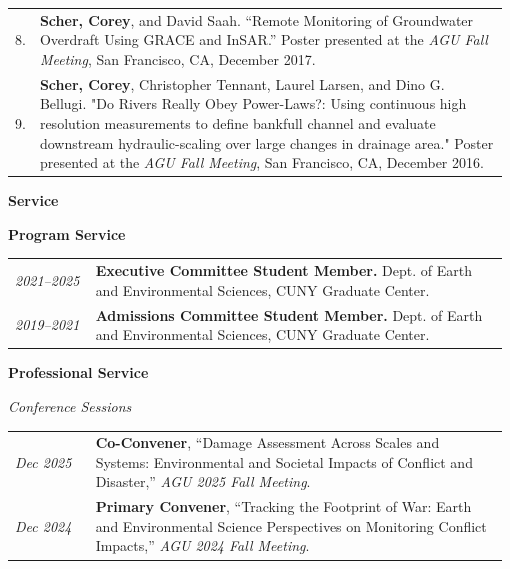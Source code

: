 \documentclass[letterpaper,11pt,oneside]{article}
\newcommand{\datefmt}[1]{\textit{#1}}
\begin{document}
\begin{longtable}{@{}p{0.03\linewidth}p{0.95\linewidth}@{}}
8. & \textbf{Scher, Corey}, and David Saah. “Remote Monitoring of Groundwater Overdraft Using GRACE and InSAR.” Poster presented at the \textit{AGU Fall Meeting}, San Francisco, CA, December 2017.\\[1.0ex]

9. & \textbf{Scher, Corey}, Christopher Tennant, Laurel Larsen, and Dino G. Bellugi. "Do Rivers Really Obey Power-Laws?: Using continuous high resolution measurements to define bankfull channel and evaluate downstream hydraulic-scaling over large changes in drainage area." Poster presented at the \textit{AGU Fall Meeting}, San Francisco, CA, December 2016.\\[1.0ex]

\end{longtable}
\vspace{-4ex}
\begin{flushleft}\textbf{\Large{Service}}\end{flushleft}
\vspace{-2ex}
\noindent\textbf{Program Service}
\begin{longtable}{@{}p{0.16\linewidth}p{0.82\linewidth}@{}}

\datefmt{2021–2025} & \textbf{Executive Committee Student Member.} Dept. of Earth and Environmental Sciences, CUNY Graduate Center.\\[1.0ex]

\datefmt{2019–2021} & \textbf{Admissions Committee Student Member.} Dept. of Earth and Environmental Sciences, CUNY Graduate Center.\\[1.0ex]

\end{longtable}
\vspace{-4ex}

\begin{flushleft}\textbf{Professional Service}\end{flushleft}
\vspace{-2ex}
\noindent\textit{Conference Sessions}
\begin{longtable}{@{}p{0.16\linewidth}p{0.82\linewidth}@{}}

\datefmt{Dec 2025} & \textbf{Co-Convener}, “Damage Assessment Across Scales and Systems: Environmental and Societal Impacts of Conflict and Disaster,” \textit{AGU 2025 Fall Meeting}.\\[1.0ex]

\datefmt{Dec 2024} & \textbf{Primary Convener}, “Tracking the Footprint of War: Earth and Environmental Science Perspectives on Monitoring Conflict Impacts,” \textit{AGU 2024 Fall Meeting}.\\[1.0ex]

\end{longtable}
\vspace{-4ex}
\end{document}
